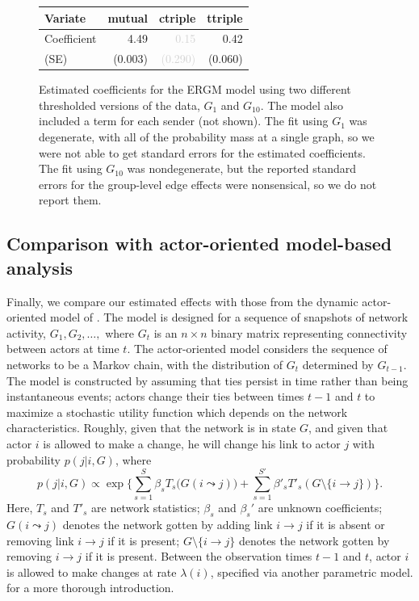 \documentclass[final]{statsoc}
\begin{document}
\begin{figure}
{\begin{tabular}{lrrr}
  \toprule
  Variate
  & \textbf{mutual}
  & \textbf{ctriple}
  & \textbf{ttriple}
  \\
  \midrule
  Coefficient
  & 4.49
  & \textcolor{LightGray}{0.15}
  & 0.42
  \\
  (SE)
  & \tiny{(0.003)}
  & \textcolor{LightGray}{\tiny{(0.290)}}
  & \tiny{(0.060)}
  \\
  \bottomrule
  \end{tabular}
}
\normalsize
\caption{Estimated coefficients for the ERGM model using two different
thresholded versions of the data, $G_1$ and $G_{10}$.  The model also included a
term for each sender (not shown).
The fit using $G_1$ was degenerate, with all of the probability mass at a
single graph, so we were not able to get standard errors for the estimated
coefficients.  The fit using $G_{10}$ was nondegenerate, but the reported
standard errors for the group-level edge effects were nonsensical, so we do
not report them.
}
\end{figure}

\subsection{Comparison with actor-oriented model-based analysis}

Finally, we compare our estimated effects with those from the dynamic
actor-oriented model of \citet{snijders2001statistical,snijders2005models}.
The model is designed for a sequence of snapshots of network activity, $G_1,
G_2, \dotsc,$ where $G_t$ is an $n \times n$ binary matrix representing
connectivity between actors at time $t$.  The actor-oriented model considers
the sequence of networks to be a Markov chain, with the distribution of $G_t$
determined by $G_{t-1}$.  The model is constructed by assuming that ties
persist in time rather than being instantaneous events; actors change their
ties between times $t-1$ and $t$ to maximize a stochastic utility function
which depends on the network characteristics.  Roughly, given that the network
is in state $G$, and given that actor $i$ is allowed to make a change, he
will change his link to actor $j$ with probability $p(j | i, G)$, where
\[
  p(j | i, G) \propto
    \exp\Big\{ \sum_{s=1}^S \beta_s T_s\big(G(i \leadsto j)\big)
      +
        \sum_{s=1}^{S'} \beta'_s T'_s(G \setminus \{ i \to j\})
    \Big\}.
\]
Here, $T_s$ and $T'_s$ are network statistics;
$\beta_s$ and $\beta_s'$ are unknown coefficients;
$G(i \leadsto j)$ denotes the network gotten by adding link $i \to j$
if it is absent or removing link $i \to j$ if it is present;
$G \setminus \{ i \to j \}$ denotes the network gotten by removing $i \to j$
if it is present.  Between the observation times $t-1$ and $t$, actor
$i$ is allowed to make changes at rate $\lambda(i)$, specified via another
parametric model.  \citet{snijders2010introduction} for a more thorough
introduction.
\end{document}
